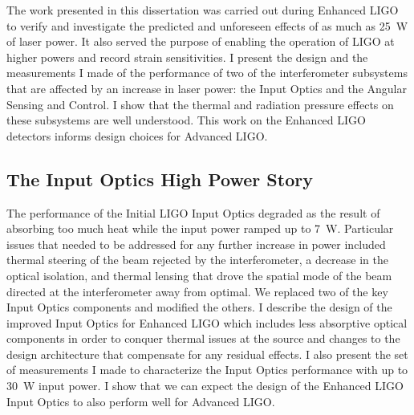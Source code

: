 The work presented in this dissertation was carried out during
Enhanced LIGO to verify and investigate the predicted and unforeseen
effects of as much as 25~W of laser power. It also served the purpose
of enabling the operation of LIGO at higher powers and record strain
sensitivities. I present the design and the measurements I made of the
performance of two of the interferometer subsystems that are affected
by an increase in laser power: the Input Optics and the Angular
Sensing and Control. I show that the thermal and radiation pressure
effects on these subsystems are well understood. This work on the
Enhanced LIGO detectors informs design choices for Advanced LIGO.




\subsection{The Input Optics High Power Story} 
The performance of the Initial LIGO Input Optics degraded as the
result of absorbing too much heat while the input power ramped up to
7~W. Particular issues that needed to be addressed for any further
increase in power included thermal steering of the beam rejected by
the interferometer, a decrease in the optical isolation, and thermal
lensing that drove the spatial mode of the beam directed at the
interferometer away from optimal. We replaced two of the key Input
Optics components and modified the others. I describe the design of
the improved Input Optics for Enhanced LIGO which includes less
absorptive optical components in order to conquer thermal issues at
the source and changes to the design architecture that compensate for
any residual effects. I also present the set of measurements I made to
characterize the Input Optics performance with up to 30~W input
power. I show that we can expect the design of the Enhanced LIGO Input
Optics to also perform well for Advanced LIGO.



